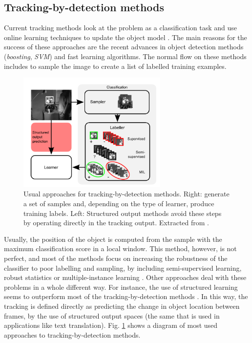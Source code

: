\subsection{Tracking-by-detection methods}

Current tracking methods look at the problem as a classification task and use online learning techniques to update the object model \cite{c23}. The main reasons for the success of these approaches are the recent advances in object detection
methods ({\it boosting}, {\it SVM}) and fast learning algorithms. 
The normal 
flow on these methods includes to 
sample the image to create a list 
of labelled training examples. 

   \begin{figure}[thpb]
      \centering
      \includegraphics[width=0.66\textwidth]{../images/tbd.png}
      \caption{Usual approaches for tracking-by-detection methods. Right: generate a set of samples and, depending on the type of learner, produce training labels. Left: Structured output methods avoid these steps by operating directly in the tracking output. Extracted from \cite{c23}.}
      \label{tr_tbd}
   \end{figure}


Usually, the position of the object 
is computed from the sample with the maximum classification score in a local window. 
This method, however, is not perfect, and most of the methods 
focus on increasing the robustness 
of the classifier to poor labelling 
and sampling, by including semi-supervised learning, robust statistics or multiple-instance 
learning \cite{c25}. Other approaches deal with these problems 
in a whole different way. For instance, the use of structured learning seems to outperform most 
of the tracking-by-detection methods \cite{c23}. In this way, 
the tracking is defined directly 
as predicting the change in object location between frames, by the use 
of structured output spaces (the same that is used in applications like text translation). Fig. \ref{tr_tbd} shows a diagram of most used approaches to tracking-by-detection methods. 
   
